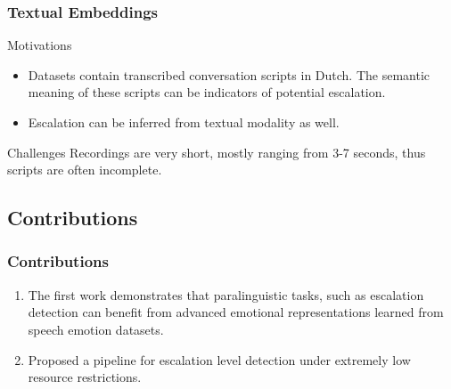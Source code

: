 \documentclass[
	11pt, %
]{beamer}
\begin{document}
\begin{frame}
	\frametitle{Textual Embeddings}
	
	
	\begin{exampleblock}{Motivations}
		\begin{itemize}
		    \item Datasets contain transcribed conversation scripts in Dutch. The semantic meaning of these scripts can be indicators of potential escalation.
		    \item Escalation can be inferred from textual modality as well.
		\end{itemize}
	\end{exampleblock}
	
	\begin{alertblock}{Challenges}
	    Recordings are very short, mostly ranging from 3-7 seconds, thus scripts are often incomplete.
	\end{alertblock}
	
\end{frame}


\subsection{Contributions}

\begin{frame}
	\frametitle{Contributions}
	\begin{enumerate}
	    \item The first work demonstrates that paralinguistic tasks, such as escalation detection can benefit from advanced emotional representations learned from speech emotion datasets.
	    \item Proposed a pipeline for escalation level detection under extremely \alert{low resource} restrictions.
	\end{enumerate}

\end{frame}
\end{document}
